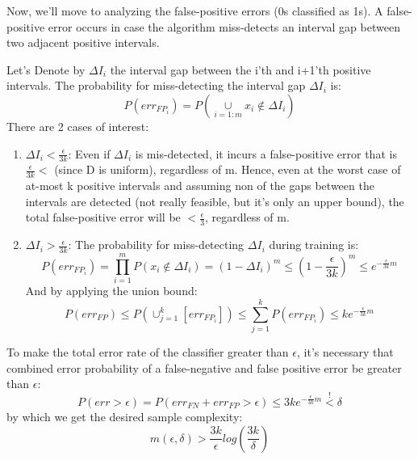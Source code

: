 Now, we'll move to analyzing the false-positive errors (0s classified as 1s). 
A false-positive error occurs in case the algorithm miss-detects an interval gap between two adjacent positive intervals.

Let's Denote by $\Delta I_{i}$ the interval gap between the i'th and i+1'th positive intervals.
The probability for miss-detecting the interval gap $\Delta I_{i}$ is:
\begin{equation*}
    P(err_{FP_i}) = P(\underset{i=1:m}{\cup} x_i \notin \Delta I_{i})
\end{equation*}
There are 2 cases of interest:
\begin{enumerate}
    \item $\Delta I_{i} < \frac{\epsilon}{3k}$: Even if $\Delta I_{i}$ is mis-detected, it incurs a false-positive error that is $\frac{\epsilon}{3k} < $ (since D is uniform), regardless of m. Hence, even at the worst case of at-most k positive intervals and assuming non of the gaps between the intervals are detected (not really feasible, but it's only an upper bound), the total false-positive error will be $< \frac{\epsilon}{3}$, regardless of m.
    \item $\Delta I_{i} > \frac{\epsilon}{3k}$: The probability for miss-detecting $\Delta I_{i} $ during training is:
    \begin{equation*}
        P(err_{FP_i}) = \prod_{i=1}^{m}P(x_i \notin \Delta I_{i}) 
        = (1-\Delta I_{i})^m \leq (1-\frac{\epsilon}{3k})^m \leq e^{-\frac{\epsilon}{3k}m}
    \end{equation*}
    And by applying the union bound:
    \begin{equation*}
        P(err_{FP}) \leq P\left(\cup_{j=1}^{k} \left[ err_{FP_i} \right]\right) \leq \sum_{j=1}^{k} P\left(err_{FP_i}\right) \leq ke^{-\frac{\epsilon}{3k}m}
    \end{equation*}
\end{enumerate}

To make the total error rate of the classifier greater than $\epsilon$, it's necessary that combined error probability of a false-negative and false positive error be greater than $\epsilon$:
\begin{equation*}
    P(err > \epsilon) = P(err_{FN} + err_{FP} > \epsilon) \leq 3ke^{-\frac{\epsilon}{3k}m} \overset{!}{<} \delta
\end{equation*}
by which we get the desired sample complexity:
\begin{equation*}
    m(\epsilon, \delta) > \frac{3k}{\epsilon} log(\frac{3k}{\delta})
\end{equation*}
